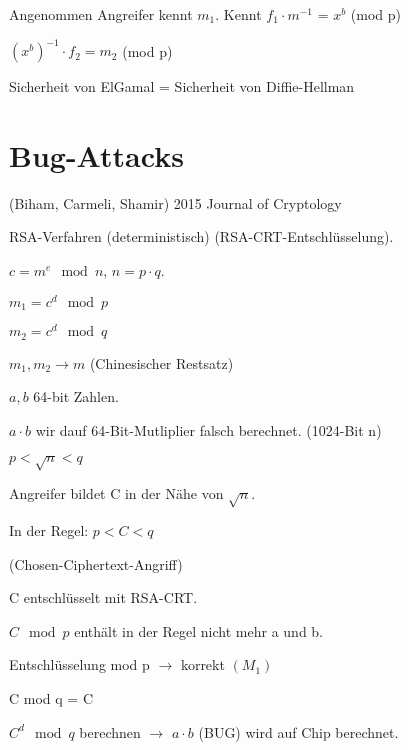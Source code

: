   \par \medskip

  Angenommen Angreifer kennt $m_1$. Kennt $f_1 \cdot m^{-1}$ = $x^b$ (mod p)

  $(x^b)^{-1} \cdot f_2 = m_2$ (mod p)

  \par \medskip

  \par \medskip

  Sicherheit von ElGamal = Sicherheit von Diffie-Hellman

  \section{Bug-Attacks}

  (Biham, Carmeli, Shamir) 2015 Journal of Cryptology

  \par \medskip

  RSA-Verfahren (deterministisch) (RSA-CRT-Entschlüsselung).

  $c = m^e \mod n$, $n = p \cdot q$.

  $m_1 = c^d \mod p$

  $m_2 = c^d \mod q$

  $m_1,m_2 \longrightarrow m$ (Chinesischer Restsatz)

  \par \medskip

  \par \medskip

  $a,b$ 64-bit Zahlen.

  $a \cdot b$ wir dauf 64-Bit-Mutliplier falsch berechnet. (1024-Bit n)

  \begin{center}
    $p < \sqrt{n} < q$
  \end{center}

  Angreifer bildet C in der Nähe von $\sqrt{n}$.

  In der Regel: $p < C < q$

  \par \medskip

  (Chosen-Ciphertext-Angriff) 

  C entschlüsselt mit RSA-CRT.

  $C \mod p$ enthält in der Regel nicht mehr a und b.

  Entschlüsselung mod p $\rightarrow$ korrekt $(M_1)$

  C mod q = C

  $C^d \mod q$ berechnen $\rightarrow$ \underline{$a \cdot b$} (BUG) wird auf Chip berechnet.

